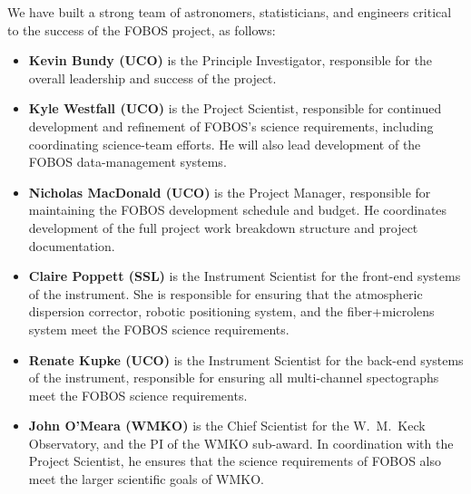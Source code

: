 \documentclass[oneside,11pt]{amsart}
\begin{document}


\begin{center}
\end{center}

\smallskip

\noindent We have built a strong team of astronomers, statisticians, and
engineers critical to the success of the FOBOS project, as follows:
%
\begin{itemize}
%
\item {\bf Kevin Bundy (UCO)} is the Principle Investigator, responsible
for the overall leadership and success of the project.\\[-5pt]
%
\item {\bf Kyle Westfall (UCO)} is the Project Scientist, responsible
for continued development and refinement of FOBOS's science
requirements, including coordinating science-team efforts.  He will also
lead development of the FOBOS data-management systems.\\[-5pt]
%
\item {\bf Nicholas MacDonald (UCO)} is the Project Manager, responsible for maintaining the FOBOS development schedule and budget. He coordinates development of the full project work breakdown structure and project documentation.\\[-5pt]
%
\item {\bf Claire Poppett (SSL)} is the Instrument Scientist for the front-end systems of the instrument. She is responsible for ensuring that the atmospheric dispersion corrector, robotic positioning system, and the fiber+microlens system meet the FOBOS science requirements.\\[-5pt]
%
\item {\bf Renate Kupke (UCO)} is the Instrument Scientist for the back-end systems of the instrument, responsible for ensuring all multi-channel spectographs meet the FOBOS science requirements.\\[-5pt]
%
\item {\bf John O'Meara (WMKO)}
is the Chief Scientist for the W.~M.~Keck Observatory, and the PI of the WMKO sub-award. In coordination with the Project Scientist, he ensures that the science requirements of FOBOS also meet the larger scientific goals of WMKO.\\[-5pt]

\end{itemize}
\end{document}

